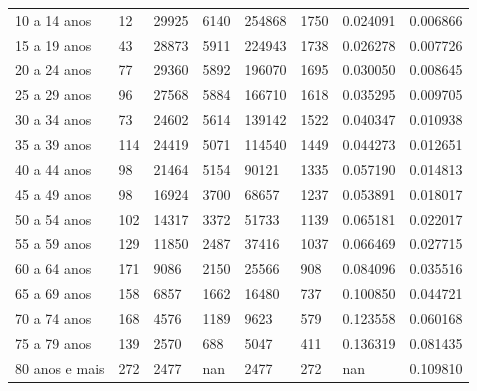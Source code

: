 \documentclass[
  12pt,
  a4paper,
]{scrreprt}
\begin{document}
\begin{longtable}[]{@{}llllllll@{}}
10 a 14 anos & 12 & 29925 & 6140 & 254868 & 1750 & 0.024091 &
0.006866 \\
15 a 19 anos & 43 & 28873 & 5911 & 224943 & 1738 & 0.026278 &
0.007726 \\
20 a 24 anos & 77 & 29360 & 5892 & 196070 & 1695 & 0.030050 &
0.008645 \\
25 a 29 anos & 96 & 27568 & 5884 & 166710 & 1618 & 0.035295 &
0.009705 \\
30 a 34 anos & 73 & 24602 & 5614 & 139142 & 1522 & 0.040347 &
0.010938 \\
35 a 39 anos & 114 & 24419 & 5071 & 114540 & 1449 & 0.044273 &
0.012651 \\
40 a 44 anos & 98 & 21464 & 5154 & 90121 & 1335 & 0.057190 & 0.014813 \\
45 a 49 anos & 98 & 16924 & 3700 & 68657 & 1237 & 0.053891 & 0.018017 \\
50 a 54 anos & 102 & 14317 & 3372 & 51733 & 1139 & 0.065181 &
0.022017 \\
55 a 59 anos & 129 & 11850 & 2487 & 37416 & 1037 & 0.066469 &
0.027715 \\
60 a 64 anos & 171 & 9086 & 2150 & 25566 & 908 & 0.084096 & 0.035516 \\
65 a 69 anos & 158 & 6857 & 1662 & 16480 & 737 & 0.100850 & 0.044721 \\
70 a 74 anos & 168 & 4576 & 1189 & 9623 & 579 & 0.123558 & 0.060168 \\
75 a 79 anos & 139 & 2570 & 688 & 5047 & 411 & 0.136319 & 0.081435 \\
80 anos e mais & 272 & 2477 & nan & 2477 & 272 & nan & 0.109810 \\
\end{longtable}
\end{document}
